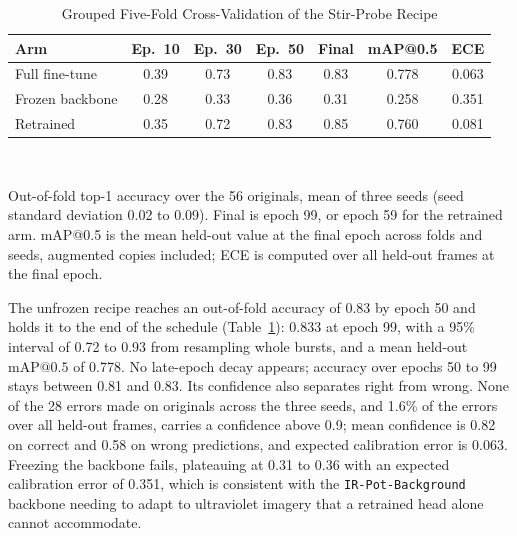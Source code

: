 ﻿\documentclass[journal]{IEEEtran}
\begin{document}
\begin{table}[!t]
\renewcommand{\arraystretch}{1.3}
\caption{Grouped Five-Fold Cross-Validation of the Stir-Probe Recipe}
\label{tab:stircv}
\centering
\footnotesize
\setlength{\tabcolsep}{3.5pt}
\begin{tabular}{l c c c c c c}
\toprule
\textbf{Arm} & \textbf{Ep.~10} & \textbf{Ep.~30} & \textbf{Ep.~50} & \textbf{Final} & \textbf{mAP@0.5} & \textbf{ECE} \\
\midrule
Full fine-tune & 0.39 & 0.73 & 0.83 & 0.83 & 0.778 & 0.063 \\
Frozen backbone & 0.28 & 0.33 & 0.36 & 0.31 & 0.258 & 0.351 \\
Retrained & 0.35 & 0.72 & 0.83 & 0.85 & 0.760 & 0.081 \\
\bottomrule
\end{tabular}
\\[2pt]
\parbox{\columnwidth}{\footnotesize Out-of-fold top-1 accuracy over the 56 originals, mean of three seeds (seed standard deviation 0.02 to 0.09). Final is epoch 99, or epoch 59 for the retrained arm. mAP@0.5 is the mean held-out value at the final epoch across folds and seeds, augmented copies included; ECE is computed over all held-out frames at the final epoch.}
\end{table}

The unfrozen recipe reaches an out-of-fold accuracy of 0.83 by epoch 50 and holds it to the end of the schedule (Table~\ref{tab:stircv}): 0.833 at epoch 99, with a 95\% interval of 0.72 to 0.93 from resampling whole bursts, and a mean held-out $\text{mAP@0.5}$ of 0.778. No late-epoch decay appears; accuracy over epochs 50 to 99 stays between 0.81 and 0.83. Its confidence also separates right from wrong. None of the 28 errors made on originals across the three seeds, and 1.6\% of the errors over all held-out frames, carries a confidence above 0.9; mean confidence is 0.82 on correct and 0.58 on wrong predictions, and expected calibration error is 0.063. Freezing the backbone fails, plateauing at 0.31 to 0.36 with an expected calibration error of 0.351, which is consistent with the \texttt{IR-Pot-Background} backbone needing to adapt to ultraviolet imagery that a retrained head alone cannot accommodate.
\end{document}
